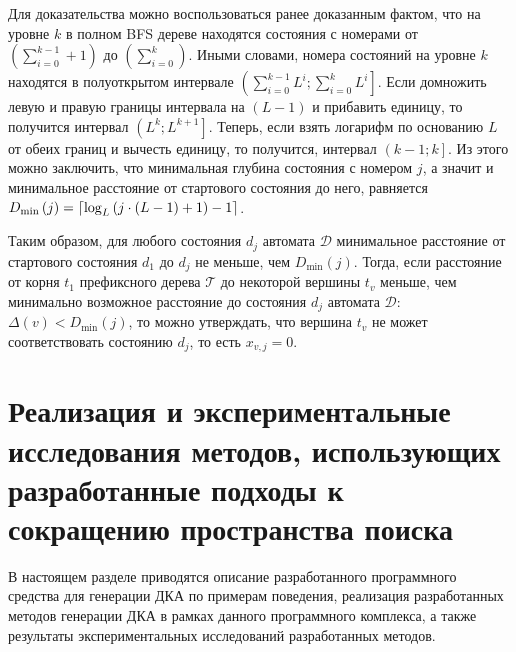 Для доказательства можно воспользоваться ранее доказанным фактом, что на уровне $k$ в полном BFS дереве находятся состояния с номерами от $\left(\sum_{i = 0}^{k - 1} + 1\right)$ до $\left(\sum_{i = 0}^{k}\right)$.
Иными словами, номера состояний на уровне $k$ находятся в полуоткрытом интервале $\left(\sum_{i = 0}^{k - 1}L^{i};\sum_{i = 0}^{k}L^{i}\right]$.
Если домножить левую и правую границы интервала на $(L - 1)$ и прибавить единицу, то получится интервал $\left(L^{k};L^{k + 1}\right]$.
Теперь, если взять логарифм по основанию $L$ от обеих границ и вычесть единицу, то получится, интервал $\left(k - 1; k\right]$.
Из этого можно заключить, что минимальная глубина состояния с номером $j$, а значит и минимальное расстояние от стартового состояния до него, равняется $D_{\min}\left(j\right) = \ceil*{\log_{L}\left(j \cdot \left(L - 1\right) + 1\right) - 1}$.

Таким образом, для любого состояния $d_{j}$ автомата $\mathcal{D}$ минимальное расстояние от стартового состояния $d_{1}$ до $d_{j}$ не меньше, чем $D_{\min}\left(j\right)$. 
Тогда, если расстояние от корня $t_{1}$ префиксного дерева $\mathcal{T}$ до некоторой вершины $t_{v}$ меньше, чем минимально возможное расстояние до состояния $d_{j}$ автомата $\mathcal{D}$: $\Delta\left(v\right) < D_{\min}\left(j\right)$, то можно утверждать, что вершина $t_{v}$ не может соответствовать состоянию $d_{j}$, то есть $x_{v,j} = 0$.





\section{Реализация и экспериментальные исследования методов, использующих разработанные подходы к сокращению пространства поиска}
\label{sec:space:results}

В настоящем разделе приводятся описание разработанного программного средства для генерации ДКА по примерам поведения, реализация разработанных методов генерации ДКА в рамках данного программного комплекса, а также результаты экспериментальных исследований разработанных методов.

